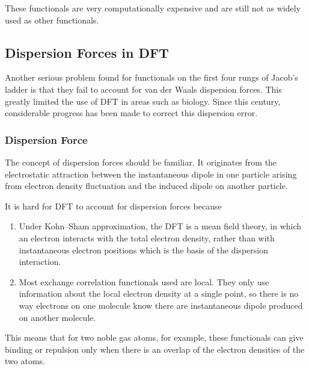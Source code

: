 \documentclass{article}
\theoremstyle{plain}\theoremheaderfont{\normalfont\itshape}\theorembodyfont{\rmfamily}\theoremseparator{.}\newtheorem*{rem}{Remark}\newtheorem*{ex}{Example}\newtheorem*{proof}{Proof}\newtheorem*{altp}{Alternative proof}
\theoremstyle{plain}\theoremheaderfont{\normalfont\bfseries}\theorembodyfont{\rmfamily}\theoremseparator{.}\newtheorem{thm}{Theorem}[section]\newtheorem{lem}[thm]{Lemma}\newtheorem{prop}[thm]{Proposition}\newtheorem*{cor}{Corollary}\newtheorem{defn}[thm]{Definition}\newtheorem{clm}[thm]{Claim}\newtheorem{clminproof}{Claim}\newtheorem{pos}{Postulate}[section]
\theoremstyle{break}\theoremheaderfont{\normalfont\itshape}\theorembodyfont{\rmfamily}\theoremseparator{.\medskip}\newtheorem*{proofskip}{Proof}\newtheorem*{exs}{Examples}\newtheorem*{rems}{Remarks}
\theoremstyle{break}\theoremheaderfont{\normalfont\bfseries}\theorembodyfont{\rmfamily}\theoremseparator{.\medskip}\newtheorem{lemskip}[thm]{Lemma}\newtheorem{defnskip}[thm]{Definition}\newtheorem{propskip}[thm]{Proposition}\newtheorem{thmskip}[thm]{Theorem}
\numberwithin{equation}{section}
\begin{document}
    These functionals are very computationally expensive and are still not as widely used as other functionals.

    \subsection{Dispersion Forces in DFT}
    Another serious problem found for functionals on the first four rungs of Jacob's ladder is that they fail to account for van der Waals dispersion forces. This greatly limited the use of DFT in areas such as biology. Since this century, considerable progress has been made to correct this dispersion error.
    \subsubsection{Dispersion Force}
    The concept of dispersion forces should be familiar. It originates from the electrostatic attraction between the instantaneous dipole in one particle arising from electron density fluctuation and the induced dipole on another particle.

    It is hard for DFT to account for dispersion forces because
    \begin{enumerate}[topsep=0pt,label=(\roman*)]
        \item Under Kohn--Sham approximation, the DFT is a mean field theory, in which an electron interacts with the total electron density, rather than with instantaneous electron positions which is the basis of the dispersion interaction.
        \item Most exchange correlation functionals used are local. They only use information about the local electron density at a single point, so there is no way electrons on one molecule know there are instantaneous dipole produced on another molecule.
    \end{enumerate}

    This means that for two noble gas atoms, for example, these functionals can give binding or repulsion only when there is an overlap of the electron densities of the two atoms.
\end{document}
